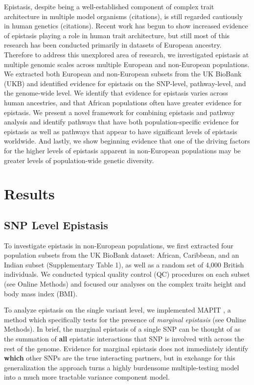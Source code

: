 \documentclass[12pt, a4paper]{article}
\begin{document}
Epistasis, despite being a well-established component of complex trait architecture in multiple model organisms (citations), is still regarded cautiously in human genetics (citations). Recent work has begun to show increased evidence of epistasis playing a role in human trait architecture, but still most of this research has been conducted primarily in datasets of European ancestry. Therefore to address this unexplored area of research, we investigated epistasis at multiple genomic scales across multiple European and non-European populations. We extracted both European and non-European subsets from the UK BioBank (UKB) \citep{Sudlow2015} and identified evidence for epistasis on the SNP-level, pathway-level, and the genome-wide level. We identify that evidence for epistasis varies across human ancestries, and that African populations often have greater evidence for epistasis. We present a novel framework for combining epistasis and pathway analysis and identify pathways that have both population-specific evidence for epistasis as well as pathways that appear to have significant levels of epistasis worldwide. And lastly, we show beginning evidence that one of the driving factors for the higher levels of epistasis apparent in non-European populations may be greater levels of population-wide genetic diversity.

\section{Results}\label{InterPath-Results}

\subsection{SNP Level Epistasis}\label{InterPath-Results-SNPEpistasis}

To investigate epistasis in non-European populations, we first extracted four population subsets from the UK BioBank dataset: African, Caribbean, and an Indian subset (Supplementary Table 1), as well as a random set of 4,000 British individuals. We conducted typical quality control (QC) procedures on each subset (see Online Methods) and focused our analyses on the complex traits height and body mass index (BMI). 

To analyze epistasis on the single variant level, we implemented MAPIT \citep{Crawford2017}, a method which specifically tests for the presence of \textit{marginal epistasis} (see Online Methods). In brief, the marginal epistasis of a single SNP can be thought of as the summation of \textbf{all} epistatic interactions that SNP is involved with across the rest of the genome. Evidence for marginal epistasis does not immediately identify \textbf{which} other SNPs are the true interacting partners, but in exchange for this generalization the approach turns a highly burdensome multiple-testing model into a much more tractable variance component model.   
\end{document}
